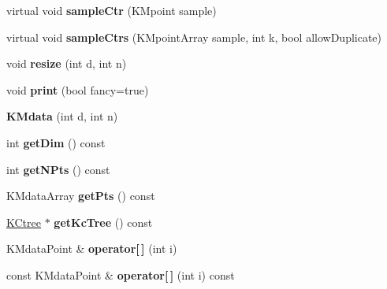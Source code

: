 \begin{DoxyCompactItemize}
\item 
\hypertarget{class_k_mdata_a56f5db60430ef1a9fe9554bb9b02b0e3}{
virtual void {\bfseries sampleCtr} (KMpoint sample)}
\label{class_k_mdata_a56f5db60430ef1a9fe9554bb9b02b0e3}

\item 
\hypertarget{class_k_mdata_ae8dfb8f5c9e3b040a15aa5a84190cdd4}{
virtual void {\bfseries sampleCtrs} (KMpointArray sample, int k, bool allowDuplicate)}
\label{class_k_mdata_ae8dfb8f5c9e3b040a15aa5a84190cdd4}

\item 
\hypertarget{class_k_mdata_ac7169bffbd4db1b2e940c9fa27979548}{
void {\bfseries resize} (int d, int n)}
\label{class_k_mdata_ac7169bffbd4db1b2e940c9fa27979548}

\item 
\hypertarget{class_k_mdata_a4ad5756c40b82a5a651f712e8de316fc}{
void {\bfseries print} (bool fancy=true)}
\label{class_k_mdata_a4ad5756c40b82a5a651f712e8de316fc}

\item 
\hypertarget{class_k_mdata_a68ec3711227e7511ea6bc5afff59fd4f}{
{\bfseries KMdata} (int d, int n)}
\label{class_k_mdata_a68ec3711227e7511ea6bc5afff59fd4f}

\item 
\hypertarget{class_k_mdata_a9830c1e3694b30369979b34984283ad9}{
int {\bfseries getDim} () const }
\label{class_k_mdata_a9830c1e3694b30369979b34984283ad9}

\item 
\hypertarget{class_k_mdata_ac23353438d1bdce80574c20556d980ea}{
int {\bfseries getNPts} () const }
\label{class_k_mdata_ac23353438d1bdce80574c20556d980ea}

\item 
\hypertarget{class_k_mdata_a945e684cb8079fbe99c448778f584c29}{
KMdataArray {\bfseries getPts} () const }
\label{class_k_mdata_a945e684cb8079fbe99c448778f584c29}

\item 
\hypertarget{class_k_mdata_a3d3c9932b99932b8cde5f7d2702a47a6}{
\hyperlink{class_k_ctree}{KCtree} $\ast$ {\bfseries getKcTree} () const }
\label{class_k_mdata_a3d3c9932b99932b8cde5f7d2702a47a6}

\item 
\hypertarget{class_k_mdata_a8305573717aecfd3ba8265895444fa59}{
KMdataPoint \& {\bfseries operator\mbox{[}$\,$\mbox{]}} (int i)}
\label{class_k_mdata_a8305573717aecfd3ba8265895444fa59}

\item 
\hypertarget{class_k_mdata_a49f9dd3177d170f54637fc45d8a5d2d8}{
const KMdataPoint \& {\bfseries operator\mbox{[}$\,$\mbox{]}} (int i) const }
\label{class_k_mdata_a49f9dd3177d170f54637fc45d8a5d2d8}


\end{DoxyCompactItemize}
